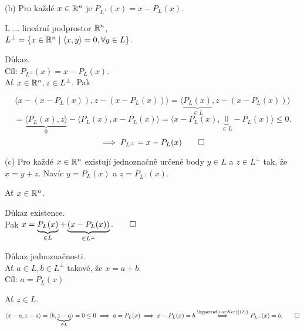 \begin{multicols}{2}
    (b) Pro každé $x \in \mathbb{R}^n$ je $P_{L^\perp} (x) = x - P_L (x)$.

    L $\dots$ lineární podprostor $\mathbb{R}^n$,\\
    $L^\perp = \left\lbrace x \in \mathbb{R}^n \mid \langle x, y\rangle = 0, \forall y \in L \right\rbrace$.

    Důkaz.\\
    Cíl: $P_{L^\perp} (x) = x - P_L(x)$.\\
    Ať $x \in \mathbb{R}^n, z \in L^\perp$. Pak

\columnbreak

\end{multicols}

\[
    \langle x - (x - P_L(x)), z - (x - P_L(x))\rangle = \langle \underbrace{P_L(x)}_{\in L}, z - (x - P_L(x))\rangle
\]
\[
    = \underbrace{\langle P_L (x), z\rangle}_0 - \langle P_L (x), x-P_L(x)\rangle = 
    \langle x - P_L (x), \underbrace{0}_{\in L} - P_L(x)\rangle \leq 0. 
\]
\[
    \implies P_{L^\perp} = x- P_L(x) \qed
\]

(c) Pro každé $x \in \mathbb{R}^n$ existují jednoznačně určené body $y \in L$ a $z \in L^\perp$ tak, že $x=y + z$. Navíc 
$y = P_L(x)$ a $z=P_{L^ \perp} (x)$.

Ať $x \in \mathbb{R}^n$.

Důkaz existence.\\
Pak  $x = \underbrace{P_L (x)}_{\in L} + \underbrace{(x - P_L (x))}_{\in L^\perp}. \qed$

Důkaz jednoznačnosti.\\
Ať $a \in L, b \in L^\perp$ takové, že $x = a+b$.\\
Cíl: $a = P_L (x)$

Ať $z \in L$.
\[
    \langle x-a, z-a\rangle = \langle b, \underbrace{z-a}_{\in L}\rangle = 0 \leq 0 \implies a = P_L (x) \implies 
    x - P_L(x) = b \stackrel{\hyperref[varNer]{(2)}}{\implies} P_{L^\perp} (x) = b. \qed
\]
